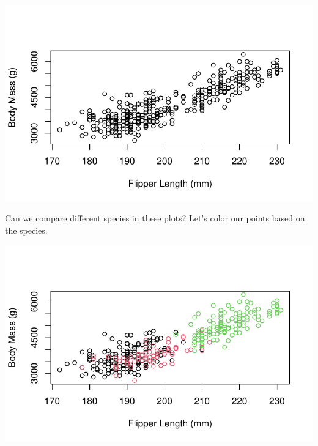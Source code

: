 \documentclass[
  letterpaper,
  DIV=11,
  numbers=noendperiod]{scrreprt}
\newenvironment{Shaded}{\begin{snugshade}}{\end{snugshade}}
\newcommand{\AttributeTok}[1]{\textcolor[rgb]{0.40,0.45,0.13}{#1}}
\newcommand{\CommentTok}[1]{\textcolor[rgb]{0.37,0.37,0.37}{#1}}
\newcommand{\FunctionTok}[1]{\textcolor[rgb]{0.28,0.35,0.67}{#1}}
\newcommand{\NormalTok}[1]{\textcolor[rgb]{0.00,0.23,0.31}{#1}}
\newcommand{\SpecialCharTok}[1]{\textcolor[rgb]{0.37,0.37,0.37}{#1}}
\newcommand{\StringTok}[1]{\textcolor[rgb]{0.13,0.47,0.30}{#1}}
\begin{document}
\includegraphics{scripts/02_dataViz/class4_files/figure-pdf/numvsnum2-1.pdf}

Can we compare different species in these plots? Let's color our points
based on the species.

\begin{Shaded}
\end{Shaded}

\includegraphics{scripts/02_dataViz/class4_files/figure-pdf/num_vs_num_species-1.pdf}
\end{document}
